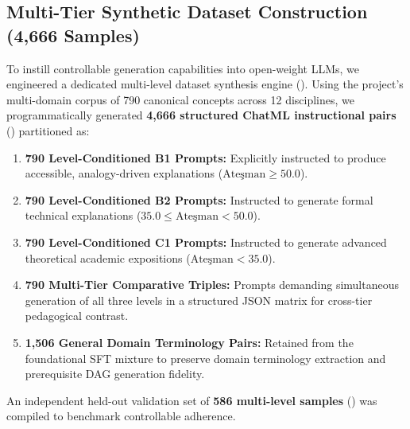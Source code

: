 \documentclass[a4paper,12pt]{report}
\begin{document}
\subsection{Multi-Tier Synthetic Dataset Construction (4,666 Samples)}
To instill controllable generation capabilities into open-weight LLMs, we engineered a dedicated multi-level dataset synthesis engine (). Using the project's multi-domain corpus of 790 canonical concepts across 12 disciplines, we programmatically generated \textbf{4,666 structured ChatML instructional pairs} () partitioned as:
\begin{enumerate}
    \item \textbf{790 Level-Conditioned B1 Prompts:} Explicitly instructed to produce accessible, analogy-driven explanations ($\text{Ate\c{s}man} \ge 50.0$).
    \item \textbf{790 Level-Conditioned B2 Prompts:} Instructed to generate formal technical explanations ($35.0 \le \text{Ate\c{s}man} < 50.0$).
    \item \textbf{790 Level-Conditioned C1 Prompts:} Instructed to generate advanced theoretical academic expositions ($\text{Ate\c{s}man} < 35.0$).
    \item \textbf{790 Multi-Tier Comparative Triples:} Prompts demanding simultaneous generation of all three levels in a structured JSON matrix for cross-tier pedagogical contrast.
    \item \textbf{1,506 General Domain Terminology Pairs:} Retained from the foundational SFT mixture to preserve domain terminology extraction and prerequisite DAG generation fidelity.
\end{enumerate}
An independent held-out validation set of \textbf{586 multi-level samples} () was compiled to benchmark controllable adherence.
\end{document}

